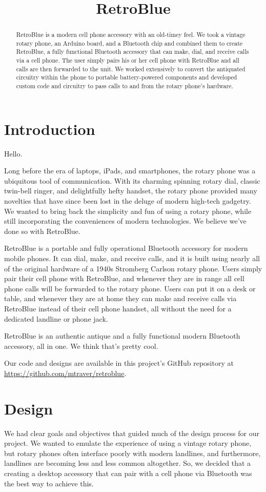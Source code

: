 \documentclass{es50report}
\title{RetroBlue}
\begin{document}
    \maketitlepage

    \begin{abstract}
        RetroBlue is a modern cell phone accessory with an old-timey feel. We took a vintage rotary phone, an Arduino board, and a Bluetooth chip and combined them to create RetroBlue, a fully functional Bluetooth accessory that can make, dial, and receive calls via a cell phone. The user simply pairs his or her cell phone with RetroBlue and all calls are then forwarded to the unit. We worked extensively to convert the antiquated circuitry within the phone to portable battery-powered components and developed custom code and circuitry to pass calls to and from the rotary phone's hardware.
    \end{abstract}
    \newpage

    \section{Introduction}
    Hello. 
    
    Long before the era of laptops, iPads, and smartphones, the rotary phone was a ubiquitous tool of communication. With its charming spinning rotary dial, classic twin-bell ringer, and delightfully hefty handset,  the rotary phone provided many novelties that have since been lost in the deluge of modern high-tech gadgetry. We wanted to bring back the simplicity and fun of using a rotary phone, while still incorporating the conveniences of modern technologies. We believe we've done so with RetroBlue.
    
    RetroBlue is a portable and fully operational Bluetooth accessory for modern mobile phones. It can dial, make, and receive calls, and it is built using nearly all of the original hardware of a 1940s Stromberg Carlson rotary phone. Users simply pair their cell phone with RetroBlue, and whenever they are in range all cell phone calls will be forwarded to the rotary phone. Users can put it on a desk or table, and whenever they are at home they can make and receive calls via RetroBlue instead of their cell phone handset, all without the need for a dedicated landline or phone jack. 
    
    RetroBlue is an authentic antique and a fully functional modern Bluetooth accessory, all in one. We think that's pretty cool.

    Our code and designs are available in this project's GitHub repository at \url{https://github.com/mtraver/retroblue}.

    \section{Design}
        We had clear goals and objectives that guided much of the design process for our project. We wanted to emulate the experience of using a vintage rotary phone, but rotary phones often interface poorly with modern landlines, and furthermore, landlines are becoming less and less common altogether. So, we decided that a creating a desktop accessory that can pair with a cell phone via Bluetooth was the best way to achieve this.
        
\end{document}
